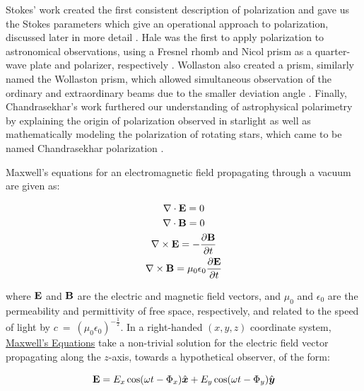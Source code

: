 Stokes' work created the first consistent description of polarization and gave us the Stokes parameters which give an operational approach to polarization, discussed later in more detail \citep{Stokes}. Hale was the first to apply polarization to astronomical observations, using a Fresnel rhomb and Nicol prism as a quarter-wave plate and polarizer, respectively \citep{Hale_pre,Hale_post}. Wollaston also created a prism, similarly named the Wollaston prism, which allowed simultaneous observation of the ordinary and extraordinary beams due to the smaller deviation angle \citep{WollPrism}. Finally, Chandrasekhar's work furthered our understanding of astrophysical polarimetry by explaining the origin of polarization observed in starlight as well as mathematically modeling the polarization of rotating stars, which came to be named Chandrasekhar polarization \citep{chandrasekhar}.
\prgph


Maxwell's equations for an electromagnetic field propagating through a vacuum are given as:

\begin{equation}
    \begin{gathered}
        \nabla \cdot \mathbf{E} = 0 \\
        \nabla \cdot \mathbf{B} = 0 \\
        \nabla \times \mathbf{E} = - \frac{\partial \mathbf{B}}{\partial t} \\
        \nabla \times \mathbf{B} = \mu_{0} \epsilon_{0} \frac{\partial \mathbf{E}}{\partial t}
    \end{gathered}
    \label{eq:Maxwell}
\end{equation}

\noindent where $\mathbf{E}$ and $\mathbf{B}$ are the electric and magnetic field vectors, and $\mu_{0}$ and $\epsilon_{0}$ are the permeability and permittivity of free space, respectively, and related to the speed of light by $c~=~(\mu_{0} \epsilon_{0})^{-\frac{1}{2}}$. In a right-handed $(x, y, z)$ coordinate system, \hyperref[eq:Maxwell]{Maxwell's Equations} take a non-trivial solution for the electric field vector propagating along the $z$-axis, towards a hypothetical observer, of the form:

\begin{equation}
    \mathbf{E} = E_{x} \cos(\omega t - \Phi_{x}) \hat{\boldsymbol{x}} +
    E_{y} \cos(\omega t - \Phi_{y}) \hat{\boldsymbol{y}}
    \label{eq:Maxwell_sol}
\end{equation}

